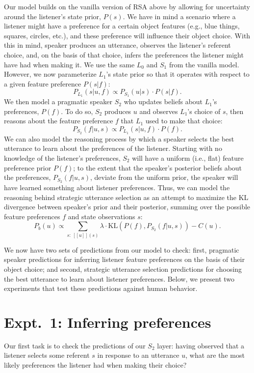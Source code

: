 \documentclass[10pt,a4paper]{article}
\begin{document}
Our model builds on the vanilla version of RSA above by allowing for uncertainty around the listener's state prior, $P(s)$. We have in mind a scenario where a listener might have a preference for a certain object features (e.g., blue things, squares, circles, etc.), and these preference will influence their object choice. With this in mind, speaker produces an utterance, observes the listener's referent choice, and, on the basis of that choice, infers the preferences the listener might have had when making it. We use the same $L_0$ and $S_1$ from the vanilla model. However, we now parameterize $L_1$'s state prior so that it operates with respect to a given feature preference $P(s|f)$:
$$P_{L_{1}}(s|u,f) \propto P_{S_{1}}(u|s) \cdot P(s|f).$$
We then model a pragmatic speaker $S_2$ who updates beliefs about $L_1$'s preferences, $P(f)$. To do so, $S_2$ produces $u$ and observes $L_1$'s choice of $s$, then reasons about the feature preference $f$ that $L_1$ used to make that choice:
$$P_{S_{2}}(f|u,s) \propto P_{L_{1}}(s|u,f) \cdot P(f).$$
We can also model the reasoning process by which a speaker selects the best utterance to learn about the preferences of the listener. Starting with no knowledge of the listener's preferences, $S_2$ will have a uniform (i.e., flat) feature preference prior $P(f)$; to the extent that the speaker's posterior beliefs about the preferences, $P_{S_{2}}(f|u,s)$, deviate from the uniform prior, the speaker will have learned something about listener preferences. Thus, we can model the reasoning behind strategic utterance selection as an attempt to maximize the KL divergence between speaker's prior and their posterior, summing over the possible feature preferences $f$ and state observations $s$:
$$P_{b}(u) \propto \sum_{s:\  [\![u]\!](s)}\lambda \cdot \textrm{KL}(P(f),P_{S_{2}}(f|u,s))-C(u).$$

We now have two sets of predictions from our model to check: first, pragmatic speaker predictions for inferring listener feature preferences on the basis of their object choice; and second, strategic utterance selection predictions for choosing the best utterance to learn about listener preferences. Below, we present two experiments that test these predictions against human behavior.


\section{Expt.~1: Inferring preferences}

Our first task is to check the predictions of our $S_2$ layer: having observed that a listener selects some referent $s$ in response to an utterance $u$, what are the most likely preferences the listener had when making their choice? 
\end{document}

